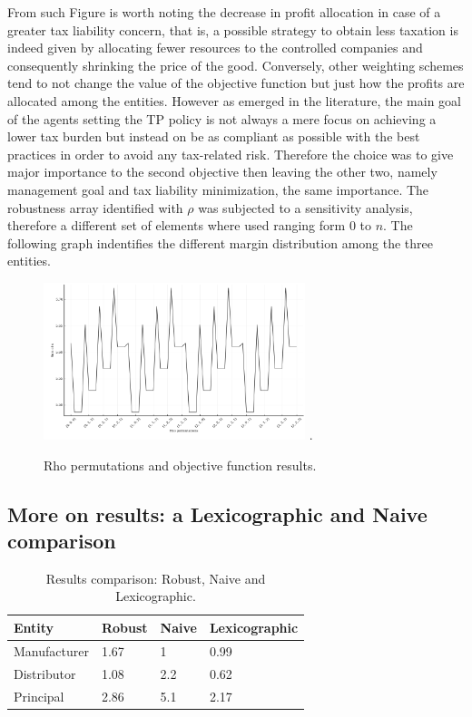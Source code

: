 \documentclass[conference,final,a4paper]{IEEEtran}
\begin{document}
From such Figure is worth noting the decrease in profit allocation in case of a greater tax liability concern, that is, a possible strategy to obtain less taxation is indeed given by allocating fewer resources to the controlled companies and consequently shrinking the price of the good. Conversely, other weighting schemes tend to not change the value of the objective function but just how the profits are allocated among the entities. However as emerged in the literature, the main goal of the agents setting the TP policy is not always a mere focus on achieving a lower tax burden but instead on be as compliant as possible with the best practices in order to avoid any tax-related risk. Therefore the choice was to give major importance to the second objective then leaving the other two, namely management goal and
tax liability minimization, the same importance. The robustness array identified with \(\rho\) was subjected to a sensitivity analysis, therefore a different set of elements where used
ranging form \(0\) to \(n\). The following graph indentifies the different margin distribution among the three entities.

\begin{figure}[]
\centering
\includegraphics[width=3in]{figure/Figure_1.png}
\DeclareGraphicsExtensions.
\caption{Rho permutations and objective function results.}
\label{last}
\end{figure}

\hypertarget{more-result}{%
  \subsection{More on results: a Lexicographic and Naive comparison}\label{conclusion}}

\begin{table}[]
\centering
\caption{Results comparison: Robust, Naive and Lexicographic.}
\label{res-comparison}
\begin{tabular}{@{}llll@{}}
\toprule
  Entity       & Robust & Naive & Lexicographic \\ \midrule
  Manufacturer & 1.67   & 1     & 0.99     \\ 
  Distributor  & 1.08   & 2.2   & 0.62     \\
  Principal    & 2.86   & 5.1   & 2.17     \\ \bottomrule
\end{tabular}
\end{table}
\end{document}
